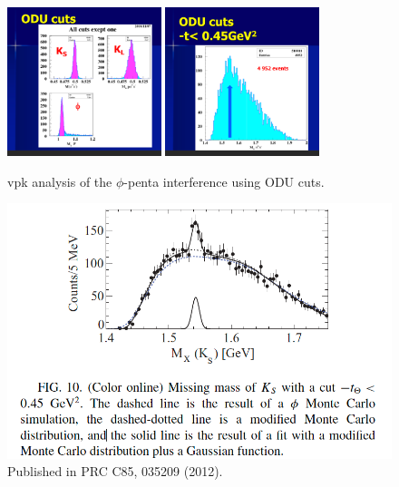 \documentclass[12pt]{article}
\begin{document}
\begin{figure}[h!]
\center
\includegraphics[width=0.4\textwidth]{KS_KL_phi.png}
\includegraphics[width=0.4\textwidth]{Mx_pi+pi-.png}
\caption{ \label{fig:vpk} vpk analysis of the $\phi$-penta interference using ODU cuts.}
\end{figure}

\begin{figure}[h!]
\center
\includegraphics[width=0.8 \textwidth]{Mx_pi+pi-_PRC.png}
\caption{ \label{fig:PRC} Published in PRC C85, 035209 (2012).}
\end{figure}
\end{document}
